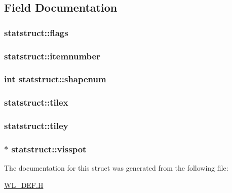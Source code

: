 \subsection{Field Documentation}
\hypertarget{structstatstruct_ac118449094c044bae15c0664e6bf909b}{
\subsubsection[{flags}]{ {\bf statstruct::flags}}}
\label{structstatstruct_ac118449094c044bae15c0664e6bf909b}
\hypertarget{structstatstruct_a0e599c7ceb980b5b8c0216c301a544c5}{
\subsubsection[{itemnumber}]{ {\bf statstruct::itemnumber}}}
\label{structstatstruct_a0e599c7ceb980b5b8c0216c301a544c5}
\hypertarget{structstatstruct_a0ec8572937d3f1b28860d99776b82753}{
\subsubsection[{shapenum}]{\setlength{\rightskip}{0pt plus 5cm}int {\bf statstruct::shapenum}}}
\label{structstatstruct_a0ec8572937d3f1b28860d99776b82753}
\hypertarget{structstatstruct_a506fcf983f04e3169ec29fdcb0b5ff22}{
\subsubsection[{tilex}]{ {\bf statstruct::tilex}}}
\label{structstatstruct_a506fcf983f04e3169ec29fdcb0b5ff22}
\hypertarget{structstatstruct_a0a6ae69d06cffdb4de2c8489c16a5fbc}{
\subsubsection[{tiley}]{ {\bf statstruct::tiley}}}
\label{structstatstruct_a0a6ae69d06cffdb4de2c8489c16a5fbc}
\hypertarget{structstatstruct_a8b26aa7b11d0feb8c396a23f5ece7457}{
\subsubsection[{visspot}]{$\ast$ {\bf statstruct::visspot}}}
\label{structstatstruct_a8b26aa7b11d0feb8c396a23f5ece7457}


The documentation for this struct was generated from the following file:\begin{DoxyCompactItemize}
\item 
\hyperlink{WL__DEF_8H}{WL\_\-DEF.H}\end{DoxyCompactItemize}
